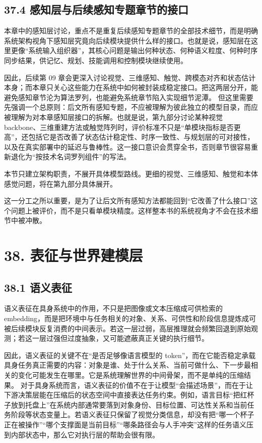 \section*{37.4 感知层与后续感知专题章节的接口}


本章中的感知层讨论，重点不是重复后续感知专题章节的全部技术细节，而是明确系统架构视角下感知层究竟向后续模块提供什么样的接口。也就是说，感知层在这里更像“系统输入组织器”，其核心问题是输出何种状态、何种语义粒度、何种时序同步结果，供记忆、规划、技能调用和控制模块继续使用。

因此，后续第 09 章会更深入讨论视觉、三维感知、触觉、跨模态对齐和状态估计本身；而本章只关心这些能力在系统中如何被封装成稳定接口。把这两层分开，能避免感知章节沦为算法罗列，也能避免系统章节陷入实现细节泥潭。 但这里需要先强调一个总原则：后文所有感知专题，不应被理解为彼此独立的模型目录，而应被理解为对本章感知层接口的拆解。也就是说，第九部分讨论某种视觉 backbone、三维重建方法或触觉阵列时，评价标准不只是“单模块指标是否更高”，还包括它是否改善了状态估计稳定性、时序一致性、与规划层的可对接性，以及在真实部署中的延迟与鲁棒性。这一接口意识会贯穿全书，否则章节很容易重新退化为“按技术名词罗列组件”的写法。

本节只建立架构职责，不展开具体模型路线。更细的视觉、三维感知、触觉和本体感觉问题，将在第九部分具体展开。

这一分工之所以重要，是为了让后文所有感知方法都能回到“它改善了什么接口”这个问题上被评价，而不是只看单模块精度。这样整本书的系统视角才不会在技术细节中被冲散。

\chapter*{38. 表征与世界建模层}

\section*{38.1 语义表征}


语义表征在具身系统中的作用，不只是把图像或文本压缩成可供检索的 embedding，而是把环境中与任务相关的对象、关系、可供性和阶段信息提炼成可被后续模块反复消费的中间表示。若这一层过弱，高层推理就会频繁回退到原始观测；若这一层过强但过度抽象，又可能遮蔽真正关键的执行细节。

因此，语义表征的关键不在“是否足够像语言模型的 token”，而在它能否稳定承载具身任务真正需要的内容：对象是谁、处于什么关系、当前可做什么、下一步最相关的变化可能发生在哪里。它是系统理解世界的中间骨架，而不是单纯的压缩结果。 对于具身系统而言，语义表征的价值不在于让模型“会描述场景”，而在于让下游决策层能在压缩后的状态空间中直接表达任务约束。例如，语言目标“把红杯子放到托盘上”在系统内部通常要落到对象身份、目标位置、可达性关系和当前任务阶段等状态变量上。若语义表征只保留了视觉分类信息，却没有把“哪一个杯子正在被操作”“哪个支撑面是当前目标”“哪条路径会与人手冲突”这样的任务语义压到内部状态中，那么它对执行层的帮助会很有限。

